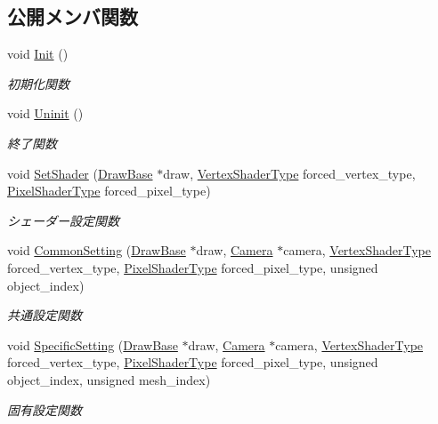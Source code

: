 \subsection*{公開メンバ関数}
\begin{DoxyCompactItemize}
\item 
void \mbox{\hyperlink{class_shader_manager_a8e8fd62a28cc18addcd5ec6507a5dcb0}{Init}} ()
\begin{DoxyCompactList}\small\item\em 初期化関数 \end{DoxyCompactList}\item 
void \mbox{\hyperlink{class_shader_manager_afc31a6bbe86e6b57edd7be0972f48ab1}{Uninit}} ()
\begin{DoxyCompactList}\small\item\em 終了関数 \end{DoxyCompactList}\item 
void \mbox{\hyperlink{class_shader_manager_ad2caed4ae50c1ca784151d0f9e50c381}{Set\+Shader}} (\mbox{\hyperlink{class_draw_base}{Draw\+Base}} $\ast$draw, \mbox{\hyperlink{class_shader_manager_a9b51e49d70eb3cc58f6d1f3994e8cfbd}{Vertex\+Shader\+Type}} forced\+\_\+vertex\+\_\+type, \mbox{\hyperlink{class_shader_manager_a7d15d773b3c6a99dd7086c45c8b0be5f}{Pixel\+Shader\+Type}} forced\+\_\+pixel\+\_\+type)
\begin{DoxyCompactList}\small\item\em シェーダー設定関数 \end{DoxyCompactList}\item 
void \mbox{\hyperlink{class_shader_manager_a6cfff8f4aee59d9bc5162a5a6f4d07d4}{Common\+Setting}} (\mbox{\hyperlink{class_draw_base}{Draw\+Base}} $\ast$draw, \mbox{\hyperlink{class_camera}{Camera}} $\ast$camera, \mbox{\hyperlink{class_shader_manager_a9b51e49d70eb3cc58f6d1f3994e8cfbd}{Vertex\+Shader\+Type}} forced\+\_\+vertex\+\_\+type, \mbox{\hyperlink{class_shader_manager_a7d15d773b3c6a99dd7086c45c8b0be5f}{Pixel\+Shader\+Type}} forced\+\_\+pixel\+\_\+type, unsigned object\+\_\+index)
\begin{DoxyCompactList}\small\item\em 共通設定関数 \end{DoxyCompactList}\item 
void \mbox{\hyperlink{class_shader_manager_af016392b9b0477d49165d753e9404ff4}{Specific\+Setting}} (\mbox{\hyperlink{class_draw_base}{Draw\+Base}} $\ast$draw, \mbox{\hyperlink{class_camera}{Camera}} $\ast$camera, \mbox{\hyperlink{class_shader_manager_a9b51e49d70eb3cc58f6d1f3994e8cfbd}{Vertex\+Shader\+Type}} forced\+\_\+vertex\+\_\+type, \mbox{\hyperlink{class_shader_manager_a7d15d773b3c6a99dd7086c45c8b0be5f}{Pixel\+Shader\+Type}} forced\+\_\+pixel\+\_\+type, unsigned object\+\_\+index, unsigned mesh\+\_\+index)
\begin{DoxyCompactList}\small\item\em 固有設定関数 \end{DoxyCompactList}\end{DoxyCompactItemize}


